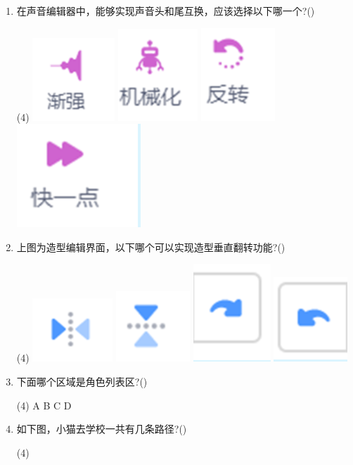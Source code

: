 \documentclass[10.5pt, a4paper]{article}
\begin{document}
\begin{enumerate}
        \item 在声音编辑器中，能够实现声音头和尾互换，应该选择以下哪一个?(\qquad)
        \begin{tasks}(4)
            \task \includegraphics[width=.05\textwidth]{17a.png}
            \task \includegraphics[width=.05\textwidth]{17b.png}
            \task \includegraphics[width=.04\textwidth]{17c.png}
            \task \includegraphics[width=.05\textwidth]{17d.png}
        \end{tasks}

        \item 上图为造型编辑界面，以下哪个可以实现造型垂直翻转功能?(\qquad)
        \begin{tasks}(4)
            \task \includegraphics[width=.05\textwidth]{18a.png}
            \task \includegraphics[width=.05\textwidth]{18b.png}
            \task \includegraphics[width=.04\textwidth]{18c.png}
            \task \includegraphics[width=.05\textwidth]{18d.png}
        \end{tasks}

        \item 下面哪个区域是角色列表区?(\qquad)
        \begin{tasks}(4)
            \task A
            \task B
            \task C
            \task D
        \end{tasks}

        \item 如下图，小猫去学校一共有几条路径?(\qquad)
        \begin{tasks}(4)
        \end{tasks}


\end{enumerate}
\end{document}
